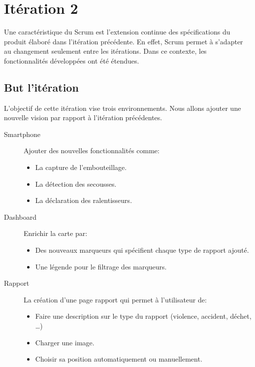 \chapter{Itération 2}

Une caractéristique du Scrum est l'extension continue des spécifications du
produit élaboré dans l'itération précédente. En effet, Scrum permet à s'adapter
au changement seulement entre les itérations. Dans ce contexte, les
fonctionnalités développées ont été étendues.

\section{But l'itération}

L'objectif de cette itération vise trois environnements. Nous allons ajouter
une nouvelle vision par rapport à l'itération précédentes.

\begin{description}
    \item [Smartphone] Ajouter des nouvelles fonctionnalités comme:
        \begin{itemize}
            \item La capture de l'embouteillage.
            \item La détection des secousses.
            \item La déclaration des ralentisseurs.
        \end{itemize}
    \item [Dashboard] Enrichir la carte par:
        \begin{itemize}
            \item Des nouveaux marqueurs qui spécifient chaque type de rapport
                ajouté.
            \item Une légende pour le filtrage des marqueurs.
        \end{itemize}
    \item [Rapport] La création d'une page rapport qui permet à l'utilisateur
        de:
        \begin{itemize}
            \item Faire une description sur le type du rapport (violence,
                accident, déchet, \ldots)
            \item Charger une image.
            \item Choisir sa position automatiquement ou manuellement.
        \end{itemize}
\end{description}

